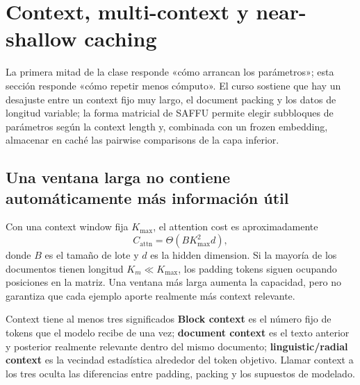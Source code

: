 \section{Context, multi-context y near-shallow caching}

La primera mitad de la clase responde «cómo arrancan los parámetros»; esta sección responde «cómo repetir menos cómputo». El curso sostiene que hay un desajuste entre un context fijo muy largo, el document packing y los datos de longitud variable; la forma matricial de SAFFU permite elegir subbloques de parámetros según la context length y, combinada con un frozen embedding, almacenar en caché las pairwise comparisons de la capa inferior.

\subsection{Una ventana larga no contiene automáticamente más información útil}

Con una context window fija $K_{\max}$, el attention cost es aproximadamente
\[
C_{\text{attn}}=\Theta(BK_{\max}^{2}d),
\]
donde $B$ es el tamaño de lote y $d$ es la hidden dimension. Si la mayoría de los documentos tienen longitud $K_m\ll K_{\max}$, los padding tokens siguen ocupando posiciones en la matriz. Una ventana más larga aumenta la capacidad, pero no garantiza que cada ejemplo aporte realmente más context relevante.


\begin{knowledgebox}{Context tiene al menos tres significados}
\textbf{Block context} es el número fijo de tokens que el modelo recibe de una vez; \textbf{document context} es el texto anterior y posterior realmente relevante dentro del mismo documento; \textbf{linguistic/radial context} es la vecindad estadística alrededor del token objetivo. Llamar context a los tres oculta las diferencias entre padding, packing y los supuestos de modelado.
\end{knowledgebox}


